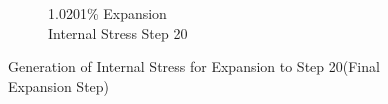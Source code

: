 \begin{figure}[ht!]
\begin{subfigure}{.25\textwidth}
      \caption{1.0201\% Expansion\\Internal Stress Step 20}
    \end{subfigure}

\caption{Generation of Internal Stress for Expansion to Step 20(Final Expansion Step)}
\label{fig:A30P25_stress}
\end{figure}
